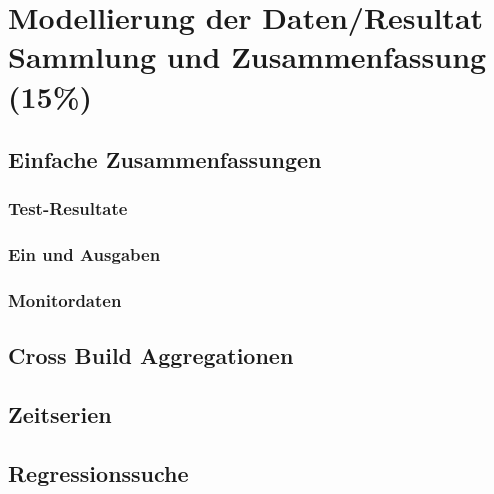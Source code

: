 \chapter{Modellierung der Daten/Resultat Sammlung und Zusammenfassung (15\%)}
\section{Einfache Zusammenfassungen}
\subsection{Test-Resultate}
\subsection{Ein und Ausgaben}
\subsection{Monitordaten}
\section{Cross Build Aggregationen}
\section{Zeitserien}
\section{Regressionssuche}


